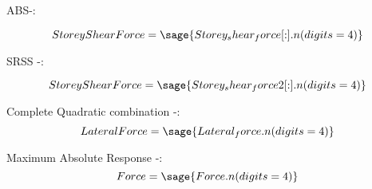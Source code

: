 \documentclass[12pt]{report}
\begin{document}
ABS-:

\begin{equation}
	Storey Shear Force=\sage{Storey_shear_force[:].n(digits=4)}
\end{equation}

SRSS -:

\begin{equation}
	Storey Shear Force=\sage{Storey_shear_force2[:].n(digits=4)}
\end{equation}

Complete Quadratic combination -:
\begin{equation}
	Lateral Force =\sage{Lateral_force.n(digits=4)}
\end{equation}

Maximum Absolute Response -:
\begin{equation}
	Force =\sage{Force.n(digits=4)}
\end{equation}
\end{document}
